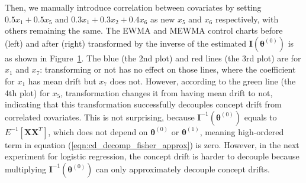 \documentclass[twoside,11pt]{article}
\begin{document}
\begin{enumerate}[(I)]
\begin{figure}[!htbp]
  \label{fig:lin_reg_not_ind_X}
\end{figure}
Then, we manually introduce correlation between {covariates} by setting $0.5 x_1 + 0.5 x_5$ and $ 0.3 x_1 + 0.3 x_2 + 0.4 x_6$ as new $x_5$ and $x_6$ respectively, with others remaining the same. The EWMA and MEWMA control charts before (left) and after (right) transformed by {the inverse of the estimated} ${\mathbf {I}}(\bm { \theta}^{(0)})$ is as shown in Figure~\ref{fig:lin_reg_not_ind_X}. The blue (the 2nd plot) and red lines (the 3rd plot) are for $x_1$ and $x_7$: transforming or not has no effect on those lines, where the coefficient for $x_1$ has mean {drift} but $x_7$ does not. However, according to the green line (the 4th plot) for $x_5$, transformation changes it from having mean {drift} to not, indicating that this transformation successfully decouples concept drift from correlated covariates. This is not surprising, because ${\mathbf {I}} ^{-1}(\bm { \theta}^{(0)})$ equals to $E ^{-1} [\bm {X}\bm {X}^T]$, which does not depend on $ \bm { \theta} ^{(0)}$ or $ \bm { \theta} ^{(1)}$, meaning high-ordered term in equation (\ref{eqn:cd_decomp_fisher_approx}) is zero. However, in the next experiment for logistic regression, the concept drift is harder to decouple because multiplying ${\mathbf {I}} ^{-1}(\bm { \theta}^{(0)})$ can only approximately decouple concept drifts.


\end{enumerate}
\end{document}
